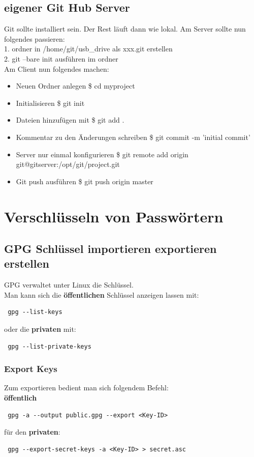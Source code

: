 \documentclass[11pt,fleqn]{book} %
\numberwithin{equation}{section} %
\numberwithin{figure}{section} %
\numberwithin{table}{section} %
\begin{document}
\section{eigener Git Hub Server}
Git sollte installiert sein. Der Rest läuft dann wie lokal. Am Server sollte nun folgendes passieren:\\
1. ordner in /home/git/usb\_drive als xxx.git erstellen\\
2. git --bare init ausführen im ordner\\
Am Client nun folgendes machen:\\
\begin{itemize}
 \item Neuen Ordner anlegen \$ cd myproject
 \item Initialisieren \$ git init
 \item Dateien hinzufügen mit \$ git add .
 \item Kommentar zu den Änderungen schreiben \$ git commit -m 'initial commit'
 \item Server nur einmal konfigurieren \$ git remote add origin git@gitserver:/opt/git/project.git
 \item Git push ausführen \$ git push origin master
\end{itemize}
\chapter{Verschlüsseln von Passwörtern}
\section{GPG Schlüssel importieren exportieren erstellen}
GPG verwaltet unter Linux die Schlüssel.\\
Man kann sich die \textbf{öffentlichen} Schlüssel anzeigen lassen mit:
\begin{lstlisting}
 gpg --list-keys
\end{lstlisting}
oder die \textbf{privaten} mit:
\begin{lstlisting}
 gpg --list-private-keys
\end{lstlisting}
\subsection{Export Keys}
Zum exportieren bedient man sich folgendem Befehl:\\
\textbf{öffentlich}
\begin{lstlisting}
 gpg -a --output public.gpg --export <Key-ID>
\end{lstlisting}
für den \textbf{privaten}:
\begin{lstlisting}
 gpg --export-secret-keys -a <Key-ID> > secret.asc
\end{lstlisting}
\end{document}
